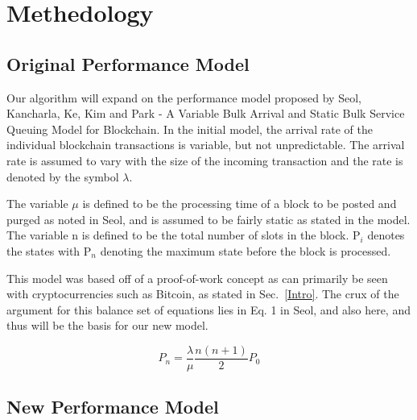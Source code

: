 \documentclass[conference]{IEEEtran}
\begin{document}
\section{Methedology}

\subsection{Original Performance Model}\label{Model}
Our algorithm will expand on the performance model proposed by Seol, Kancharla, Ke, Kim and Park
 - A Variable Bulk Arrival and Static Bulk Service Queuing Model for Blockchain\cite{2020_ACM_Seol}. 
 In the initial model, the arrival rate of the individual blockchain transactions is variable, but not unpredictable. 
 The arrival rate is assumed to vary with the size of the incoming transaction and the rate is 
 denoted by the symbol $\lambda$.

The variable $\mu$ is defined to be the processing time of a block to be posted and purged as noted 
in Seol\cite{2020_ACM_Seol}, and is assumed to be fairly static as stated in the model. 
The variable n is defined to be the total number of slots in the block. P$_i$ denotes the states with 
P$_n$ denoting the maximum state before the block is processed. 

This model was based off of a proof-of-work concept as can primarily be seen with cryptocurrencies 
such as Bitcoin, as stated in Sec.~\ref{Intro}. The crux of the argument for this balance set of equations 
lies in Eq. 1 in Seol\cite{2020_ACM_Seol}, and also here, and thus will be the basis for our 
new model. 

\begin{equation}
P_n = \frac{\lambda}{\mu}\frac{n(n+1)}{2}P_0\label{om_1}
\end{equation}

\subsection{New Performance Model}\label{new_model}
\end{document}
